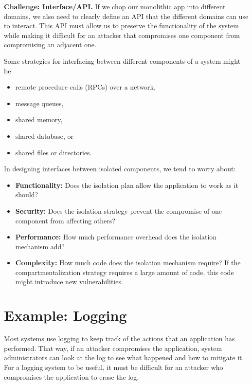 \documentclass[
  letterpaper,
]{scrbook}
\providecommand{\tightlist}{%
  \setlength{\itemsep}{0pt}\setlength{\parskip}{0pt}}
\theoremstyle{definition}
\theoremstyle{plain}
\theoremstyle{plain}
\theoremstyle{remark}
\begin{document}
\textbf{Challenge: Interface/API.} If we chop our monolithic app into
different domains, we also need to clearly define an API that the
different domains can use to interact. This API must allow us to
preserve the functionality of the system while making it difficult for
an attacker that compromises one component from compromising an adjacent
one.

Some strategies for interfacing between different components of a system
might be

\begin{itemize}
\tightlist
\item
  remote procedure calls (RPCs) over a network,
\item
  message queues,
\item
  shared memory,
\item
  shared database, or
\item
  shared files or directories.
\end{itemize}

In designing interfaces between isolated components, we tend to worry
about:

\begin{itemize}
\tightlist
\item
  \textbf{Functionality:} Does the isolation plan allow the application
  to work as it should?
\item
  \textbf{Security:} Does the isolation strategy prevent the compromise
  of one component from affecting others?
\item
  \textbf{Performance:} How much performance overhead does the isolation
  mechanism add?
\item
  \textbf{Complexity:} How much code does the isolation mechanism
  require? If the compartmentalization strategy requires a large amount
  of code, this code might introduce new vulnerabilities.
\end{itemize}

\section{Example: Logging}\label{example-logging}

Most systems use logging to keep track of the actions that an
application has performed. That way, if an attacker compromises the
application, system administrators can look at the log to see what
happened and how to mitigate it. For a logging system to be useful, it
must be difficult for an attacker who compromises the application to
erase the log.
\end{document}
